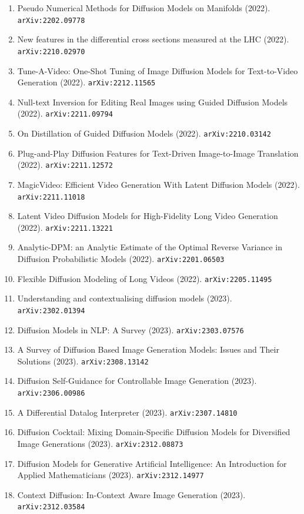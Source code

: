 \documentclass[11pt]{article}
\begin{document}
\begin{enumerate}
  \item Pseudo Numerical Methods for Diffusion Models on Manifolds (2022). \texttt{arXiv:2202.09778}
  \item New features in the differential cross sections measured at the LHC (2022). \texttt{arXiv:2210.02970}
  \item Tune-A-Video: One-Shot Tuning of Image Diffusion Models for Text-to-Video Generation (2022). \texttt{arXiv:2212.11565}
  \item Null-text Inversion for Editing Real Images using Guided Diffusion Models (2022). \texttt{arXiv:2211.09794}
  \item On Distillation of Guided Diffusion Models (2022). \texttt{arXiv:2210.03142}
  \item Plug-and-Play Diffusion Features for Text-Driven Image-to-Image Translation (2022). \texttt{arXiv:2211.12572}
  \item MagicVideo: Efficient Video Generation With Latent Diffusion Models (2022). \texttt{arXiv:2211.11018}
  \item Latent Video Diffusion Models for High-Fidelity Long Video Generation (2022). \texttt{arXiv:2211.13221}
  \item Analytic-DPM: an Analytic Estimate of the Optimal Reverse Variance in Diffusion Probabilistic Models (2022). \texttt{arXiv:2201.06503}
  \item Flexible Diffusion Modeling of Long Videos (2022). \texttt{arXiv:2205.11495}
  \item Understanding and contextualising diffusion models (2023). \texttt{arXiv:2302.01394}
  \item Diffusion Models in NLP: A Survey (2023). \texttt{arXiv:2303.07576}
  \item A Survey of Diffusion Based Image Generation Models: Issues and Their Solutions (2023). \texttt{arXiv:2308.13142}
  \item Diffusion Self-Guidance for Controllable Image Generation (2023). \texttt{arXiv:2306.00986}
  \item A Differential Datalog Interpreter (2023). \texttt{arXiv:2307.14810}
  \item Diffusion Cocktail: Mixing Domain-Specific Diffusion Models for Diversified Image Generations (2023). \texttt{arXiv:2312.08873}
  \item Diffusion Models for Generative Artificial Intelligence: An Introduction for Applied Mathematicians (2023). \texttt{arXiv:2312.14977}
  \item Context Diffusion: In-Context Aware Image Generation (2023). \texttt{arXiv:2312.03584}

\end{enumerate}
\end{document}
